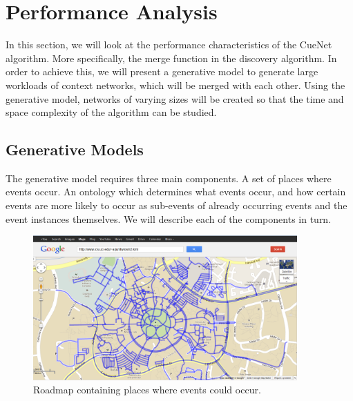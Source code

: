 \section{Performance Analysis}
In this section, we will look at the performance characteristics of the CueNet algorithm. More specifically, the merge function in the discovery algorithm. In order to achieve this, we will present a generative model to generate large workloads of context networks, which will be merged with each other. Using the generative model, networks of varying sizes will be created so that the time and space complexity of the algorithm can be studied.

\subsection{Generative Models}
The generative model requires three main components. A set of places where events occur. An ontology which determines what events occur, and how certain events are more likely to occur as sub-events of already occurring events and the event instances themselves. We will describe each of the components in turn. 


\begin{figure}[t]
\centering
\includegraphics[width=0.9\textwidth]{media/chapter5/perf/map-locations.png}
\caption{Roadmap containing places where events could occur.}
\label{fig:osm-roadmap-uci}
\end{figure}

